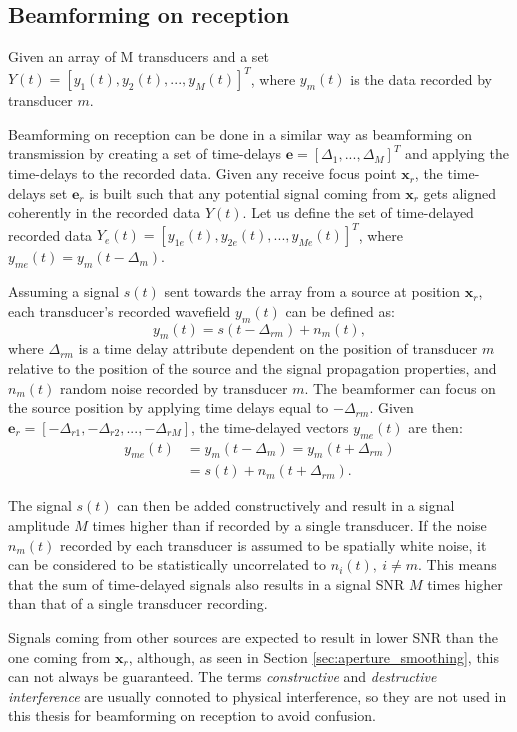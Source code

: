\subsection{Beamforming on reception}
\label{sec:beamforming_reception}
Given an array of M transducers and a set $Y(t) = [y_1(t), y_2(t), ..., y_M(t)]^T$, where $y_m(t)$ is the data recorded by transducer $m$.

Beamforming on reception can be done in a similar way as beamforming on transmission by creating a set of time-delays $\boldsymbol{e} = [\Delta_1, ..., \Delta_M]^T$ and applying the time-delays to the recorded data. Given any receive focus point $\boldsymbol{x}_r$, the time-delays set $\boldsymbol{e}_r$ is built such that any potential signal coming from $\boldsymbol{x}_r$ gets aligned coherently in the recorded data $Y(t)$.
Let us define the set of time-delayed recorded data $Y_e(t) = [y_{1e}(t), y_{2e}(t), ..., y_{Me}(t)]^T$, where $y_{me}(t) = y_m(t - \Delta_m)$.

Assuming a signal $s(t)$ sent towards the array from a source at position $\boldsymbol{x}_r$, each transducer's recorded wavefield $y_m(t)$ can be defined as:
\begin{equation}
    y_m(t) = s(t - \Delta_{rm}) + n_m(t),
\end{equation}
\noindent
where $\Delta_{rm}$ is a time delay attribute dependent on the position of transducer $m$ relative to the position of the source and the signal propagation properties, and $n_m(t)$ random noise recorded by transducer $m$.
The beamformer can focus on the source position by applying time delays equal to $-\Delta_{rm}$. Given $\boldsymbol{e}_r = [-\Delta_{r1}, -\Delta_{r2}, ..., -\Delta_{rM}]$, the time-delayed vectors $y_{me}(t)$ are then:
\begin{align}
    y_{me}(t) &= y_m(t - \Delta_m) = y_m(t + \Delta_{rm}) \nonumber \\
    &= s(t) + n_m(t + \Delta_{rm}).
\end{align}

The signal $s(t)$ can then be added constructively and result in a signal amplitude $M$ times higher than if recorded by a single transducer. If the noise $n_m(t)$ recorded by each transducer is assumed to be spatially white noise, it can be considered to be statistically uncorrelated to $n_i(t),~i \neq m$. This means that the sum of time-delayed signals also results in a signal SNR $M$ times higher than that of a single transducer recording.

Signals coming from other sources are expected to result in lower SNR than the one coming from $\boldsymbol{x}_r$, although, as seen in Section \ref{sec:aperture_smoothing}, this can not always be guaranteed.
The terms \textit{constructive} and \textit{destructive interference} are usually connoted to physical interference, so they are not used in this thesis for beamforming on reception to avoid confusion.


